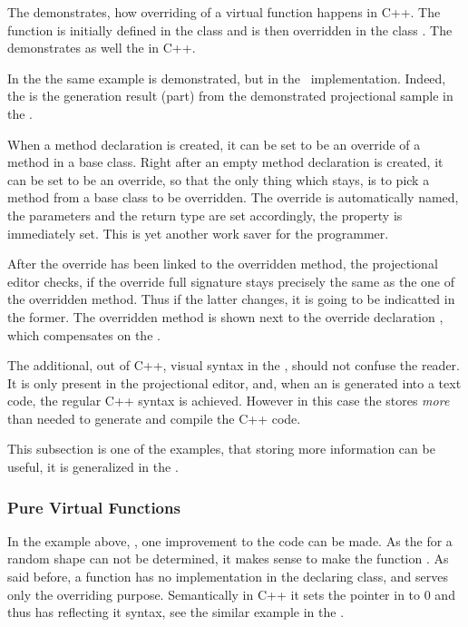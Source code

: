 The  demonstrates, how overriding of a virtual function happens in C++.
The function  is initially defined in the class  and is then overridden
in the class . The  demonstrates as well the  in C++.


In the  the same example is demonstrated, but in the \pcpp\ implementation.
Indeed, the  is the generation result (part) from the demonstrated projectional sample in
the .

When a method declaration is created, it can be set to be an override of a method in a base class.
Right after an empty method declaration is created, it can be set to be an override, so that the only
thing which stays, is to pick a method from a base class to be overridden. The override is automatically
named, the parameters and the return type are set accordingly, the  property is immediately
set. This is yet another work saver for the programmer.

After the override has been linked to the overridden method, the projectional editor checks, if 
the override full signature stays precisely the same as the one of the overridden method. Thus if the 
latter changes, it is going to be indicatted in the former.
The overridden method is shown next to the override declaration , which 
compensates on the .


The additional, out of C++, visual syntax in the \pcpp, should not confuse the reader. It is only 
present in the projectional editor, and, when an  is generated into a text code, the regular
C++ syntax is achieved. However in this case the  stores \emph{more} than needed to 
generate and compile the C++ code. 

This subsection is one of the examples, that storing more information can be useful,
it is generalized in the .


\subsubsection{Pure Virtual Functions}
\label{purevirtualfuncs}

In the example above, , one improvement to the code can be made. As the  for a random shape can not 
be determined, it makes sense to make the  function . As said before, a  
function has no implementation in the declaring class, and serves only the overriding purpose. Semantically in C++ it sets the 
pointer in  to 0 and thus has reflecting it syntax, see the similar example in the .

